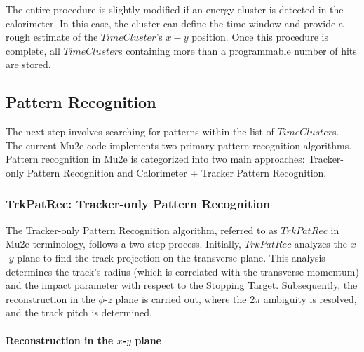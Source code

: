 The entire procedure is slightly modified if an energy cluster 
is detected in the calorimeter. In this case, the cluster can 
define the time window and provide a rough estimate of the 
$TimeCluster$'s $x-y$ position. Once this procedure is complete, 
all $TimeCluster$s containing more than a programmable number of hits are stored.
\subsection{Pattern Recognition}
The next step involves searching for patterns 
within the list of $TimeCluster$s. The current Mu2e 
code implements two primary pattern recognition algorithms. 
Pattern recognition in Mu2e is categorized into two main 
approaches: Tracker-only Pattern Recognition and Calorimeter + Tracker Pattern Recognition.

\subsubsection{TrkPatRec: Tracker-only Pattern Recognition}

The Tracker-only Pattern Recognition algorithm, referred 
to as $TrkPatRec$ in Mu2e terminology, follows a two-step 
process. Initially, $TrkPatRec$ analyzes the $x$-$y$ plane 
to find the track projection on the transverse plane. This 
analysis determines the track's radius (which is correlated 
with the transverse momentum) and the impact parameter with 
respect to the Stopping Target. Subsequently, the 
reconstruction in the $\phi$-$z$ plane is carried out, 
where the $2\pi$ ambiguity is resolved, and the track pitch is determined.

\paragraph{Reconstruction in the $x$-$y$ plane}

